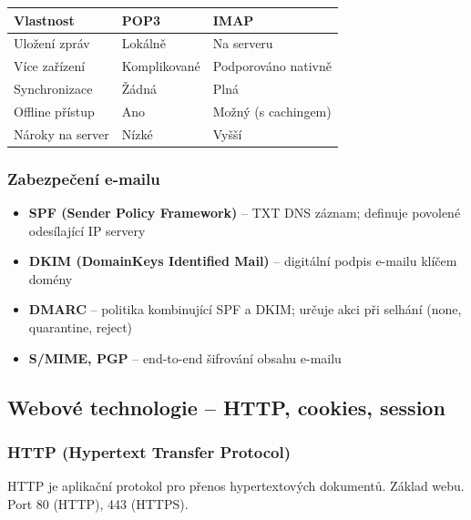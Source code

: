 \begin{center}
\begin{tabular}{lll}
\toprule
\textbf{Vlastnost} & \textbf{POP3} & \textbf{IMAP} \\
\midrule
Uložení zpráv & Lokálně & Na serveru \\
Více zařízení & Komplikované & Podporováno nativně \\
Synchronizace & Žádná & Plná \\
Offline přístup & Ano & Možný (s cachingem) \\
Nároky na server & Nízké & Vyšší \\
\bottomrule
\end{tabular}
\end{center}

\subsubsection{Zabezpečení e-mailu}

\begin{itemize}
  \item \textbf{SPF (Sender Policy Framework)} -- TXT DNS záznam; definuje povolené odesílající IP servery
  \item \textbf{DKIM (DomainKeys Identified Mail)} -- digitální podpis e-mailu klíčem domény
  \item \textbf{DMARC} -- politika kombinující SPF a DKIM; určuje akci při selhání (none, quarantine, reject)
  \item \textbf{S/MIME, PGP} -- end-to-end šifrování obsahu e-mailu
\end{itemize}

\subsection{Webové technologie -- HTTP, cookies, session}

\subsubsection{HTTP (Hypertext Transfer Protocol)}

HTTP je aplikační protokol pro přenos hypertextových dokumentů. Základ webu. Port 80 (HTTP), 443 (HTTPS).

